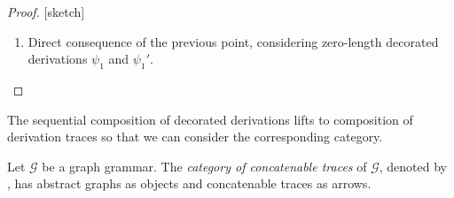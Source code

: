\begin{proof}{[sketch]}
\begin{enumerate}
\item Direct consequence of the previous point, considering zero-length decorated derivations $\psi_1$ and $\psi_1'$.
\end{enumerate}
%
\end{proof}



The sequential composition of decorated derivations lifts to
composition of derivation traces so that we can consider the
corresponding category.

\begin{definition}
  \label{de:abs-shift-cat}
   Let $\mathcal{G}$ be a graph grammar.
   The \emph{category of concatenable traces} of 
  $\mathcal{G}$, denoted by , has abstract graphs as
  objects and concatenable traces as arrows.
\end{definition}

